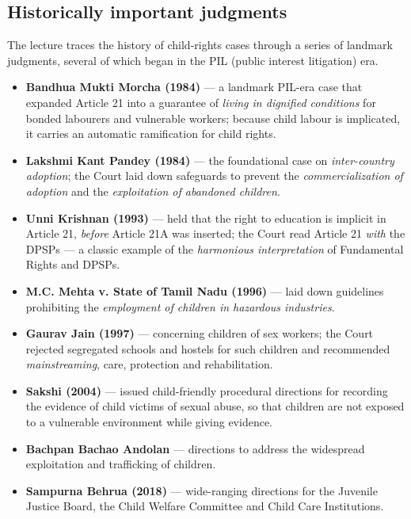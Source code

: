 \subsection{Historically important judgments}

The lecture traces the history of child-rights cases through a series of landmark
judgments, several of which began in the PIL (public interest litigation) era.

\begin{itemize}
  \item \textbf{Bandhua Mukti Morcha (1984)} — a landmark PIL-era case that expanded
        Article 21 into a guarantee of \emph{living in dignified conditions} for bonded
        labourers and vulnerable workers; because child labour is implicated, it carries
        an automatic ramification for child rights.
  \item \textbf{Lakshmi Kant Pandey (1984)} — the foundational case on \emph{inter-country
        adoption}; the Court laid down safeguards to prevent the \emph{commercialization
        of adoption} and the \emph{exploitation of abandoned children}.
  \item \textbf{Unni Krishnan (1993)} — held that the right to education is implicit in
        Article 21, \emph{before} Article 21A was inserted; the Court read Article 21
        \emph{with} the DPSPs — a classic example of the \emph{harmonious interpretation}
        of Fundamental Rights and DPSPs.
  \item \textbf{M.C. Mehta v. State of Tamil Nadu (1996)} — laid down guidelines
        prohibiting the \emph{employment of children in hazardous industries}.
  \item \textbf{Gaurav Jain (1997)} — concerning children of sex workers; the Court
        rejected segregated schools and hostels for such children and recommended
        \emph{mainstreaming}, care, protection and rehabilitation.
  \item \textbf{Sakshi (2004)} — issued child-friendly procedural directions for recording
        the evidence of child victims of sexual abuse, so that children are not exposed to
        a vulnerable environment while giving evidence.
  \item \textbf{Bachpan Bachao Andolan} — directions to address the widespread
        exploitation and trafficking of children.
  \item \textbf{Sampurna Behrua (2018)} — wide-ranging directions for the Juvenile Justice
        Board, the Child Welfare Committee and Child Care Institutions.
\end{itemize}

